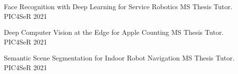\begin{cvhonors}
  \cvhonor
    {Face Recognition with Deep Learning for Service Robotics} %
    {MS Thesis Tutor.} %
    {PIC4SeR} %
    {2021} %
    
  \cvhonor
    {Deep Computer Vision at the Edge for Apple Counting}
    {MS Thesis Tutor.} %
    {PIC4SeR} %
    {2021} %
    
  \cvhonor
    {Semantic Scene Segmentation for Indoor Robot Navigation}
    {MS Thesis Tutor.} %
    {PIC4SeR} %
    {2021} %
\end{cvhonors}
